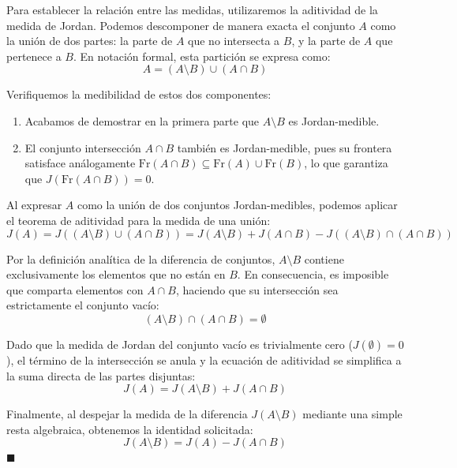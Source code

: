\documentclass[11pt,letterpaper]{article}
\begin{document}
Para establecer la relación entre las medidas, utilizaremos la aditividad de la medida de Jordan. Podemos descomponer de manera exacta el conjunto $A$ como la unión de dos partes: la parte de $A$ que no intersecta a $B$, y la parte de $A$ que pertenece a $B$. En notación formal, esta partición se expresa como:
\begin{equation*}
A = (A \setminus B) \cup (A \cap B)
\end{equation*}

Verifiquemos la medibilidad de estos dos componentes:
\begin{enumerate}
    \item Acabamos de demostrar en la primera parte que $A \setminus B$ es Jordan-medible.
    \item El conjunto intersección $A \cap B$ también es Jordan-medible, pues su frontera satisface análogamente $\text{Fr}(A \cap B) \subseteq \text{Fr}(A) \cup \text{Fr}(B)$, lo que garantiza que $J(\text{Fr}(A \cap B)) = 0$.
\end{enumerate}

Al expresar $A$ como la unión de dos conjuntos Jordan-medibles, podemos aplicar el teorema de aditividad para la medida de una unión:
\begin{equation*}
J(A) = J((A \setminus B) \cup (A \cap B)) = J(A \setminus B) + J(A \cap B) - J((A \setminus B) \cap (A \cap B))
\end{equation*}

Por la definición analítica de la diferencia de conjuntos, $A \setminus B$ contiene exclusivamente los elementos que no están en $B$. En consecuencia, es imposible que comparta elementos con $A \cap B$, haciendo que su intersección sea estrictamente el conjunto vacío:
\begin{equation*}
(A \setminus B) \cap (A \cap B) = \emptyset
\end{equation*}

Dado que la medida de Jordan del conjunto vacío es trivialmente cero ($J(\emptyset) = 0$), el término de la intersección se anula y la ecuación de aditividad se simplifica a la suma directa de las partes disjuntas:
\begin{equation*}
J(A) = J(A \setminus B) + J(A \cap B)
\end{equation*}

Finalmente, al despejar la medida de la diferencia $J(A \setminus B)$ mediante una simple resta algebraica, obtenemos la identidad solicitada:
\begin{equation*}
J(A \setminus B) = J(A) - J(A \cap B)
\end{equation*}
\hfill $\blacksquare$
\end{document}

